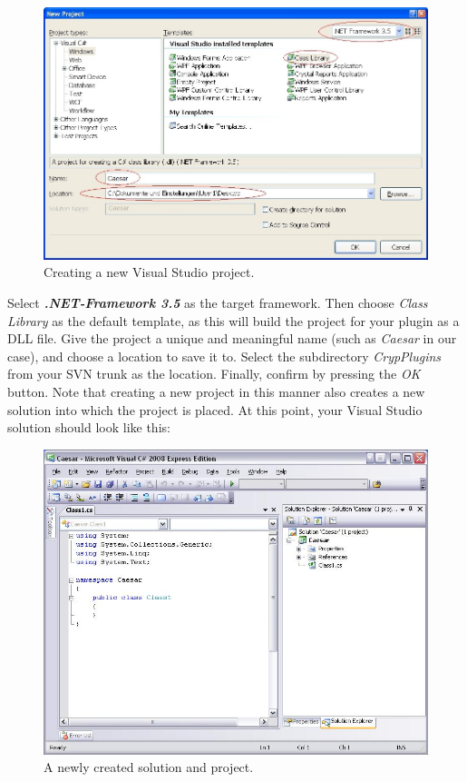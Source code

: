\begin{figure}[h!]
	\centering
		\includegraphics[width=1.00\textwidth]{figures/vs_create_new_project.jpg}
	\caption{Creating a new Visual Studio project.}
	\label{fig:vs_create_new_project}
\end{figure}
\clearpage

Select \textbf{\textit{.NET-Framework 3.5}} as the target framework. Then choose \textit{Class Library} as the default template, as this will build the project for your plugin as a DLL file. Give the project a unique and meaningful name (such as \textit{Caesar} in our case), and choose a location to save it to. Select the subdirectory \textit{CrypPlugins} from your SVN trunk as the location. Finally, confirm by pressing the \textit{OK} button. Note that creating a new project in this manner also creates a new solution into which the project is placed. At this point, your Visual Studio solution should look like this:

\begin{figure}[h!]
	\centering
		\includegraphics[width=1.00\textwidth]{figures/solution_start_up.jpg}
	\caption{A newly created solution and project.}
	\label{fig:solution_start_up}
\end{figure}
\clearpage

